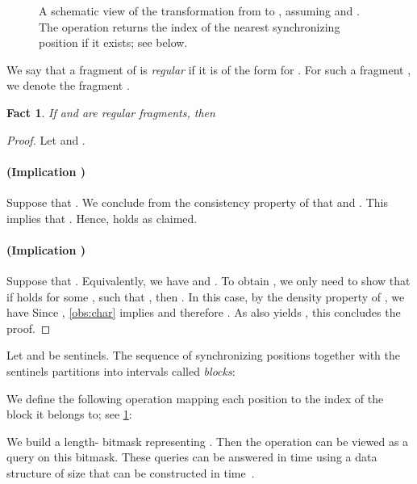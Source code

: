 \documentclass[a4paper]{article}
\newtheorem{fact}[theorem]{Fact}
\theoremstyle{definition}
\theoremstyle{remark}
\begin{document}
\begin{figure}[h]
   \caption{A schematic view of the transformation from  to , assuming  and .
  The  operation returns the index of the nearest synchronizing position if it exists; see below.}\label{fig:jak_chcesz}
\end{figure}

We say that a fragment of  is \emph{regular} if it is
of the form  for . For such a fragment , we denote the fragment .
\begin{fact}\label{fct:tp}
If  and  are regular fragments, then 
\end{fact}
\begin{proof}
Let  and  .

\paragraph*{(Implication )}
Suppose that .
We conclude from the consistency property of  that  and .
This implies that .
Hence,  holds as claimed.

\paragraph*{(Implication )}
Suppose that .
Equivalently, we have  and .
To obtain , we only need to show that if  holds for some ,  such that , then .
In this case, by the density property of , we have 
Since ,
\cref{obs:char} implies  and therefore .
As  also yields , this concludes the proof.
\end{proof}

Let  and  be sentinels. 
The sequence  of synchronizing positions
together with the sentinels partitions  into
intervals called \emph{blocks}: 

We define the following operation mapping each position  to the index of the block it belongs to;
see \cref{fig:jak_chcesz}:

We build a length- bitmask representing .
Then the  operation can be viewed as a  query on this bitmask.
These queries can be answered in  time using a data structure of size 
that can be constructed in  time~\cite{DBLP:conf/focs/Jacobson89,WaveletSuffixTree,DBLP:journals/tcs/MunroNV16}.
\end{document}
